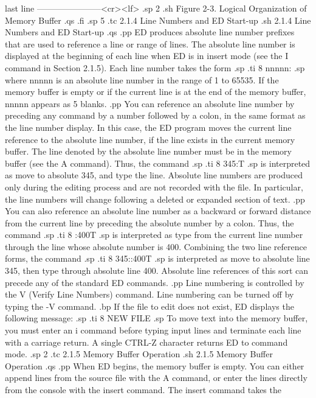       last line         -----------------------<cr><lf>
.sp 2
.sh
        Figure 2-3.  Logical Organization of Memory Buffer
.qs
.fi
.sp 5
.tc         2.1.4  Line Numbers and ED Start-up
.sh
2.1.4  Line Numbers and ED Start-up
.qs
.pp
ED produces absolute line number prefixes that are used to reference a
line or range of lines.  The absolute line number is displayed at the
beginning of each line when ED is in insert mode (see the I command in
Section 2.1.5). Each line number takes the form
.sp
.ti 8
nnnnn:
.sp
where nnnnn is an absolute line number in the range of 1 to 65535.  If the
memory buffer is empty or if the current line is at the end of the memory
buffer, nnnnn appears as 5 blanks.
.pp
You can reference an absolute line number by preceding any command by
a number followed by a colon, in the same format as the line number display.
In this case, the ED program moves the current line reference to the absolute
line number, if the line exists in the current memory buffer.  The line
denoted by the absolute line number must be in the memory buffer (see the
A command).  Thus, the command
.sp
.ti 8
345:T
.sp
is interpreted as move to absolute 345, and type the line.   Absolute line
numbers are produced only during the editing process and are not recorded
with the file.  In particular, the line numbers will change following a
deleted or expanded section of text.
.pp
You can also reference an absolute line number as a backward or forward
distance from the current line by preceding the absolute number by a colon.
Thus, the command
.sp
.ti 8
:400T
.sp
is interpreted as type from the current line number through the line whose
absolute number is 400.  Combining the two line reference forms, the
command
.sp
.ti 8
345::400T
.sp
is interpreted as move to absolute line 345, then type through
absolute line 400.  Absolute line references of this sort can precede any
of the standard ED commands.
.pp
Line numbering is controlled by the V (Verify Line Numbers) command.  Line
numbering can be turned off by typing the -V command.
.bp
If the file to edit does not exist, ED displays the following message:
.sp
.ti 8
NEW FILE
.sp
To move text into the memory buffer, you must enter an i command before typing
input lines and terminate each line with a carriage return.  A single
CTRL-Z character returns ED to command mode.
.sp 2
.tc         2.1.5  Memory Buffer Operation
.sh
2.1.5  Memory Buffer Operation
.qs
.pp
When ED begins, the memory buffer is empty.  You can either append
lines from the source file with the A command, or enter the lines directly
from the console with the insert command.  The insert command takes the
